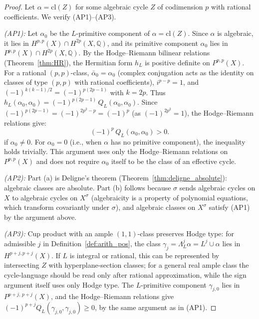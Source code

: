 \documentclass[aps,prd,twocolumn,superscriptaddress,nofootinbib]{revtex4-2}
\theoremstyle{definition}
\theoremstyle{remark}
\begin{document}
\begin{proof}
Let $\alpha = \mathrm{cl}(Z)$ for some algebraic cycle $Z$ of codimension $p$ with rational coefficients. We verify (AP1)--(AP3).

\textit{(AP1):} Let $\alpha_0$ be the $L$-primitive component of $\alpha = \mathrm{cl}(Z)$. Since $\alpha$ is algebraic, it lies in $H^{p,p}(X) \cap H^{2p}(X, \mathbb{Q})$, and its primitive component $\alpha_0$ lies in $P^{p,p}(X) \cap H^{2p}(X, \mathbb{Q})$. By the Hodge--Riemann bilinear relations (Theorem~\ref{thm:HR}), the Hermitian form $h_L$ is positive definite on $P^{p,p}(X)$. For a rational $(p,p)$-class, $\bar{\alpha}_0 = \alpha_0$ (complex conjugation acts as the identity on classes of type $(p,p)$ with rational coefficients), $i^{p-p} = 1$, and $(-1)^{k(k-1)/2} = (-1)^{p(2p-1)}$ with $k = 2p$. Thus $h_L(\alpha_0, \alpha_0) = (-1)^{p(2p-1)}\, Q_L(\alpha_0, \alpha_0)$. Since $(-1)^{p(2p-1)} = (-1)^{2p^2 - p} = (-1)^p$ (as $(-1)^{2p^2} = 1$), the Hodge--Riemann relations give:
\begin{equation}
(-1)^p\, Q_L(\alpha_0, \alpha_0) > 0.
\end{equation}
if $\alpha_0 \neq 0$. For $\alpha_0 = 0$ (i.e., when $\alpha$ has no primitive component), the inequality holds trivially. This argument uses only the Hodge--Riemann relations on $P^{p,p}(X)$ and does not require $\alpha_0$ itself to be the class of an effective cycle.

\textit{(AP2):} Part (a) is Deligne's theorem (Theorem~\ref{thm:deligne_absolute}): algebraic classes are absolute. Part (b) follows because $\sigma$ sends algebraic cycles on $X$ to algebraic cycles on $X^\sigma$ (algebraicity is a property of polynomial equations, which transform covariantly under $\sigma$), and algebraic classes on $X^\sigma$ satisfy (AP1) by the argument above.

\textit{(AP3):} Cup product with an ample $(1,1)$-class preserves Hodge type: for admissible $j$ in Definition~\ref{def:arith_pos}, the class $\gamma_j=\Lambda_L^j\alpha=L^j\cup\alpha$ lies in $H^{p+j,p+j}(X)$. If $L$ is integral or rational, this can be represented by intersecting $Z$ with hyperplane-section classes; for a general real ample class the cycle-language should be read only after rational approximation, while the sign argument itself uses only Hodge type. The $L$-primitive component $\gamma_{j,0}$ lies in $P^{p+j,\,p+j}(X)$, and the Hodge--Riemann relations give $(-1)^{p+j} Q_L(\gamma_{j,0}, \gamma_{j,0}) \geq 0$, by the same argument as in (AP1).
\end{proof}
\end{document}
